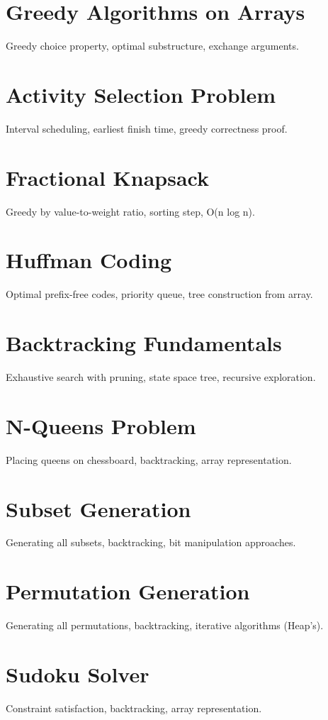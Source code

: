 \chapter{Greedy Algorithms on Arrays}
Greedy choice property, optimal substructure, exchange arguments.

\chapter{Activity Selection Problem}
Interval scheduling, earliest finish time, greedy correctness proof.

\chapter{Fractional Knapsack}
Greedy by value-to-weight ratio, sorting step, O(n log n).

\chapter{Huffman Coding}
Optimal prefix-free codes, priority queue, tree construction from array.

\chapter{Backtracking Fundamentals}
Exhaustive search with pruning, state space tree, recursive exploration.

\chapter{N-Queens Problem}
Placing queens on chessboard, backtracking, array representation.

\chapter{Subset Generation}
Generating all subsets, backtracking, bit manipulation approaches.

\chapter{Permutation Generation}
Generating all permutations, backtracking, iterative algorithms (Heap's).

\chapter{Sudoku Solver}
Constraint satisfaction, backtracking, array representation.

